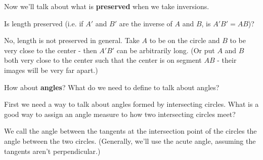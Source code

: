 \bigskip
Now we'll talk about what is \textbf{preserved} when we take inversions.

Is length preserved (i.e. if $A'$ and $B'$ are the inverse of $A$ and $B$, is $A'B' = AB$)?












No, length is not preserved in general.  Take $A$ to be on the circle and $B$ to be very close to the center - then $A'B'$ can be arbitrarily long.  (Or put $A$ and $B$ both very close to the center such that the center is on segment $AB$ - their images will be very far apart.)

How about \textbf{angles}?  What do we need to define to talk about angles?


First we need a way to talk about angles formed by intersecting circles.  What is a good way to assign an angle measure to how two intersecting circles meet?


We call the angle between the tangents at the intersection point of the circles the angle between the two circles.  (Generally, we'll use the acute angle, assuming the tangents aren't perpendicular.)

